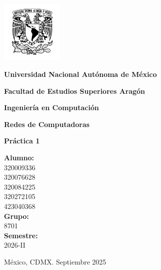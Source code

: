 \documentclass[letterpaper,12pt,oneside]{article}
\begin{document}
	\begin{titlepage}
		\centering
		
		\vspace*{0cm}  %
		\includegraphics[width=3cm]{../images1/UNAM_LOGO2.png}\par
		\vspace{0.1cm}   %
		
		{\Large \textbf{Universidad Nacional Autónoma de México} \par}
		\vspace{0.1cm}
		{\large \textbf{Facultad de Estudios Superiores Aragón} \par}
		\vspace{0.1cm}
		{\large \textbf{Ingeniería en Computación} \par}
		
		\vspace{0.1cm}  %
		
		{\LARGE \textbf{Redes de Computadoras} \par}
		\vspace{0.2cm}
		{\Large \textbf{Práctica 1} \par}
		
		\vspace{0.3cm}  %
		
		\begin{center}  
			\large
			\textbf{Alumno:} \\[0.2cm]
			320009336 \\[0.2cm]
			320076628 \\[0.2cm]
			320084225 \\[0.2cm]
			320272105 \\[0.2cm]
			423040368 \\[0.2cm]
			
			\textbf{Grupo:} \\[0.2cm]
			8701 \\[0.2cm]
			
			\textbf{Semestre:} \\[0.2cm]
			2026-II
		\end{center}
		
		\vspace{0.2cm}  %
		
		{\large México, CDMX. Septiembre 2025 \par}
		
	\end{titlepage}
	
\end{document}
